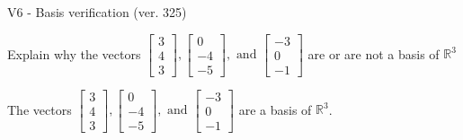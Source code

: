 \begin{exercise}
  \begin{exerciseTitle}V6 - Basis verification (ver. 325)\end{exerciseTitle}
  \begin{exerciseStatement}
    Explain why the vectors \(\left[\begin{array}{r}
3 \\
4 \\
3
\end{array}\right] , \left[\begin{array}{r}
0 \\
-4 \\
-5
\end{array}\right] , \text{ and } \left[\begin{array}{r}
-3 \\
0 \\
-1
\end{array}\right]\) are or are not a basis of \(\mathbb{R}^3\)	


  \end{exerciseStatement}
  \begin{exerciseAnswer}
   The vectors \(\left[\begin{array}{r}
3 \\
4 \\
3
\end{array}\right] , \left[\begin{array}{r}
0 \\
-4 \\
-5
\end{array}\right] , \text{ and } \left[\begin{array}{r}
-3 \\
0 \\
-1
\end{array}\right]\) 
  	 are  a basis of \(\mathbb{R}^3\).
  


  \end{exerciseAnswer}
\end{exercise}